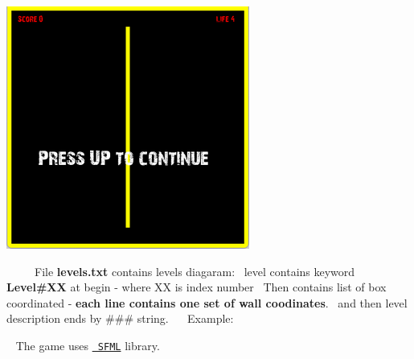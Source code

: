 \begin{DoxyInlineImage}
\includegraphics[height=\baselineskip,keepaspectratio=true]{snake2.png}%
\end{DoxyInlineImage}
    ~\newline
~\newline
~\newline
File {\bfseries{levels.\+txt}} contains level\textquotesingle{}s diagaram\+:~\newline
level contains keyword {\bfseries{Level\#XX}} at begin -\/ where XX is index number~\newline
Then contains list of box coordinated -\/ {\bfseries{each line contains one set of wall coodinates}}.~\newline
and then level description ends by \textquotesingle{}\#\#\#\textquotesingle{} string.~\newline
~\newline
Example\+: 
\begin{DoxyCode}{0}
\DoxyCodeLine{\textcolor{preprocessor}{\#\#\#}}
\DoxyCodeLine{\textcolor{preprocessor}{\#\#\#}}
\DoxyCodeLine{\textcolor{preprocessor}{\#\#\#}}

\end{DoxyCode}
 ~\newline
The game uses \href{https://www.sfml-dev.org/}{\texttt{ SFML}} library. 